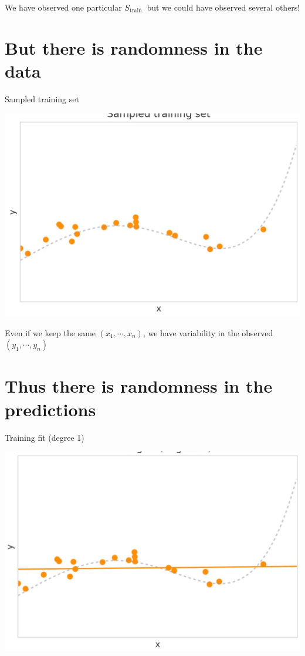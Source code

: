 \documentclass[10pt]{article}
\begin{document}
We have observed one particular $S_{\text {train }}$ but we could have observed several others!

\section*{But there is randomness in the data}
Sampled training set

\begin{center}
\includegraphics[max width=\textwidth]{2023_12_30_442f876157646883c2c9g-09}
\end{center}

Even if we keep the same $\left(x_{1}, \cdots, x_{n}\right)$, we have variability in the observed $\left(y_{1}, \cdots, y_{n}\right)$

\section*{Thus there is randomness in the predictions}
Training fit (degree 1)

\begin{center}
\includegraphics[max width=\textwidth]{2023_12_30_442f876157646883c2c9g-10(1)}
\end{center}
\end{document}
